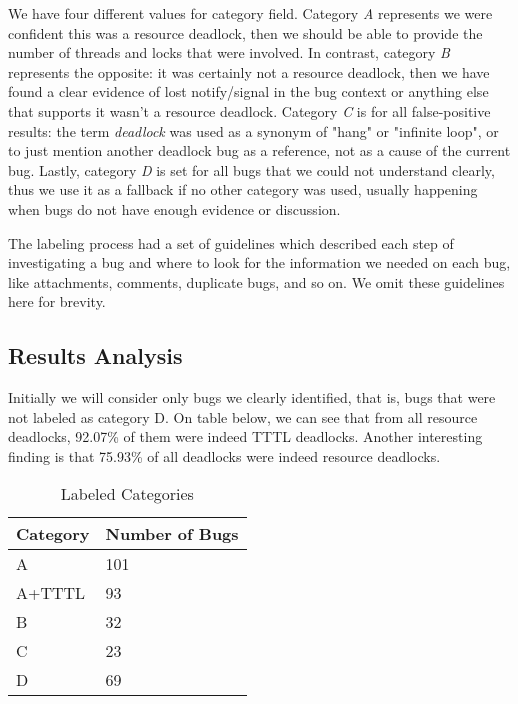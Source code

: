 We have four different values for category field.
Category \emph{A} represents we were confident this was a resource deadlock, then we should be able to provide the number of threads and locks that were involved.
In contrast, category \emph{B} represents the opposite: it was certainly not a resource deadlock, then we have found a clear evidence of lost notify/signal in the bug context or anything else that supports it wasn't a resource deadlock.
Category \emph{C} is for all false-positive results: the term \emph{deadlock} was used as a synonym of "hang" or "infinite loop", or to just mention another deadlock bug as a reference, not as a cause of the current bug.
Lastly, category \emph{D} is set for all bugs that we could not understand clearly, thus we use it as a fallback if no other category was used, usually happening when bugs do not have enough evidence or discussion.


The labeling process had a set of guidelines which described each step of investigating a bug and where to look for the information we needed on each bug, like attachments, comments, duplicate bugs, and so on. We omit these guidelines here for brevity.

\subsection{Results Analysis}

Initially we will consider only bugs we clearly identified, that is, bugs that were not labeled as category D.
On table below, we can see that from all resource deadlocks, 92.07\% of them were indeed TTTL deadlocks.
Another interesting finding is that 75.93\% of all deadlocks were indeed resource deadlocks.

\begin{table}
\begin{center}
\caption{Labeled Categories}
\begin{tabular}{|l|l|}
\hline
Category & Number of Bugs \\
\hline
A & 101 \\
A+TTTL & 93 \\
B & 32 \\
C & 23 \\
D & 69 \\
\hline
\end{tabular}
\end{center}
\end{table}


